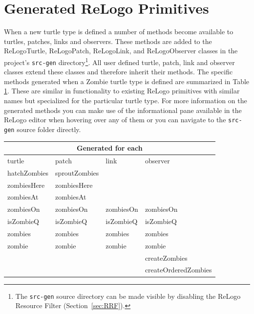 \documentclass[11pt]{amsart}
\begin{document}
\clearpage
\appendix

\section{Generated ReLogo Primitives}
\label{app:genprims}
When a new turtle type is defined a number of methods become available to turtles, patches, links and observers. These methods are added to the ReLogoTurtle, ReLogoPatch, ReLogoLink, and ReLogoObserver classes in the project's \texttt{src-gen} directory\footnote{The \texttt{src-gen} source directory can be made visible by disabling the ReLogo Resource Filter (Section~\ref{sec:RRF}).}. All user defined turtle, patch, link and observer classes extend these classes and therefore inherit their methods. The specific methods generated when a Zombie turtle type is defined are summarized in Table \ref{tab:zombiemethods}. These are similar in functionality to existing ReLogo primitives with similar names but specialized for the particular turtle type. For more information on the generated methods you can make use of the informational pane available in the ReLogo editor when hovering over any of them or you can navigate to the \texttt{src-gen} source folder directly.

\begin{table}[htbp]
   \centering
   \begin{tabular}{llll } %
      \toprule
      \multicolumn{4}{c}{Generated for each} \\
      \midrule
           turtle    & patch & link & observer \\
      \midrule
      hatchZombies  & sproutZombies \\
      zombiesHere & zombiesHere \\
      zombiesAt & zombiesAt \\
      zombiesOn & zombiesOn & zombiesOn & zombiesOn \\
      isZombieQ & isZombieQ & isZombieQ & isZombieQ \\
      zombies & zombies & zombies & zombies \\
      zombie & zombie & zombie & zombie \\
      &&& createZombies \\
      &&& createOrderedZombies \\     
     
      \bottomrule
   \end{tabular}
   \label{tab:zombiemethods}
\end{table}
\end{document}
